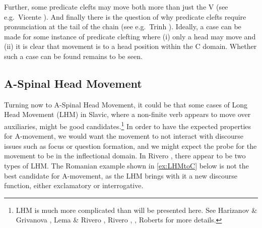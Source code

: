 \documentclass[output=paper,colorlinks,citecolor=brown,
]{langscibook}
\begin{document}
\z

Further, some predicate clefts may move both more than just the V (see e.g.\ Vicente \citeyearpar{Vicente:2009}).  And finally there is the question of why predicate clefts require pronunciation at the tail of the chain (see e.g.\ Trinh \citeyear{Trinh:2009}).  Ideally, a case can be made for some instance of predicate clefting where (i) only a head may move and (ii) it is clear that movement is to a head position within the C domain.  Whether such a case can be found remains to be seen.

\subsection{A-Spinal Head Movement}

Turning now to A-Spinal Head Movement, it could be that some cases of Long Head Movement (LHM) in Slavic, where a non-finite verb appears to move over auxiliaries, might be good candidates.\footnote{LHM is much more complicated than will be presented here.  See Harizanov \& Grivanova \citeyearpar{Harizanov:2018}, Lema \& Rivero \citeyearpar{Lema:1989}, Rivero \citeyearpar{Rivero:1991a},  \citeyearpar{Rivero:1994}, Roberts \citeyearpar{Roberts:2010} for more details.}  In order to have  the expected properties for A-movement, we would want the movement to  not interact with discourse issues such as focus or question formation, and we might expect the probe for the movement to be in the inflectional domain.  In Rivero \citeyearpar{Rivero:1994}, there appear to be two types of LHM.  The Romanian example shown in \ref{ex:LHMtoC} below is not the best candidate for A-movement, as the LHM brings with it a new discourse function, either exclamatory or interrogative.

\ea\label{ex:LHMtoC}
    \z
\z
\end{document}
